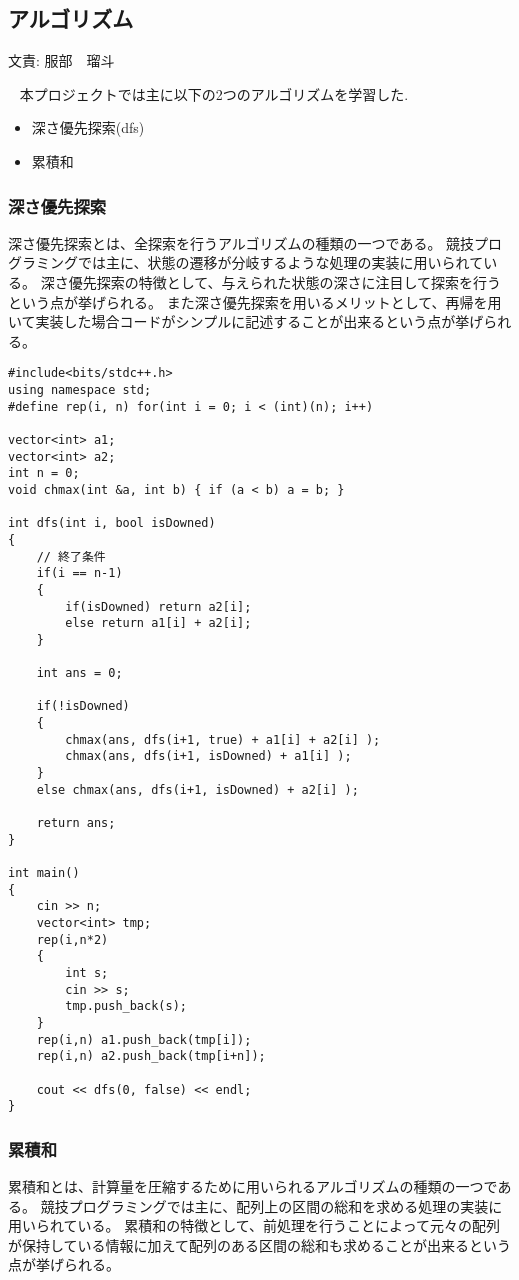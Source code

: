 \documentclass[11pt,a4paper]{jsarticle}
\newcommand{\writtenBy}[1]{\begin{flushright}文責: #1\end{flushright}~}
\begin{document}
\subsection{アルゴリズム}
\writtenBy{服部　瑠斗}
本プロジェクトでは主に以下の2つのアルゴリズムを学習した.
\begin{itemize}
    \item 深さ優先探索(dfs)
    \item 累積和
\end{itemize}

\subsubsection{深さ優先探索}
深さ優先探索とは、全探索を行うアルゴリズムの種類の一つである。
競技プログラミングでは主に、状態の遷移が分岐するような処理の実装に用いられている。
深さ優先探索の特徴として、与えられた状態の深さに注目して探索を行うという点が挙げられる。
また深さ優先探索を用いるメリットとして、再帰を用いて実装した場合コードがシンプルに記述することが出来るという点が挙げられる。

\begin{lstlisting}[caption=深さ優先探索の実装例(ABC87 C問題),label=fuga]
#include<bits/stdc++.h>
using namespace std;
#define rep(i, n) for(int i = 0; i < (int)(n); i++)

vector<int> a1;
vector<int> a2;
int n = 0;
void chmax(int &a, int b) { if (a < b) a = b; }
 
int dfs(int i, bool isDowned)
{
    // 終了条件
    if(i == n-1)
    {
        if(isDowned) return a2[i];
        else return a1[i] + a2[i];
    }
    
    int ans = 0;
     
    if(!isDowned)
    {
        chmax(ans, dfs(i+1, true) + a1[i] + a2[i] );
        chmax(ans, dfs(i+1, isDowned) + a1[i] );
    }
    else chmax(ans, dfs(i+1, isDowned) + a2[i] );
 
    return ans;
}
 
int main()
{
    cin >> n;
    vector<int> tmp;
    rep(i,n*2)
    {
        int s;
        cin >> s;
        tmp.push_back(s);
    }
    rep(i,n) a1.push_back(tmp[i]);
    rep(i,n) a2.push_back(tmp[i+n]);
 
    cout << dfs(0, false) << endl;
}
\end{lstlisting}

\subsubsection{累積和}
累積和とは、計算量を圧縮するために用いられるアルゴリズムの種類の一つである。
競技プログラミングでは主に、配列上の区間の総和を求める処理の実装に用いられている。
累積和の特徴として、前処理を行うことによって元々の配列が保持している情報に加えて配列のある区間の総和も求めることが出来るという点が挙げられる。
\end{document}
